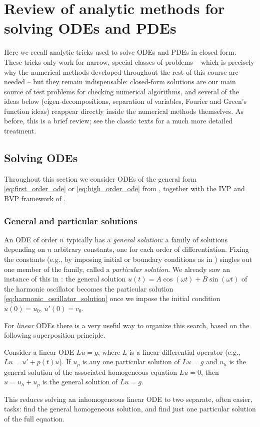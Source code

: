 \chapter{Review of analytic methods for solving ODEs and PDEs}

Here we recall analytic tricks used to solve ODEs and PDEs in closed form.
These tricks only work for narrow, special classes of problems --
which is precisely why the numerical methods developed throughout the
rest of this course are needed -- but they remain indispensable:
closed-form solutions are our main source of test problems for
checking numerical algorithms, and several of the ideas below
(eigen-decompositions, separation of variables, Fourier and Green's
function ideas) reappear directly inside the numerical methods
themselves. As before, this is a brief review; see the classic texts
\cite{boyce2017elementary,strauss2007partial} for a much more detailed
treatment.

\section{Solving ODEs}

Throughout this section we consider ODEs of the general form
\eqref{eq:first_order_ode} or \eqref{eq:high_order_ode} from
, together with the IVP and BVP framework of
.

\subsection{General and particular solutions}

An ODE of order $n$ typically has a \emph{general solution}: a family
of solutions depending on $n$ arbitrary constants, one for each order
of differentiation. Fixing the constants (e.g., by imposing initial or
boundary conditions as in ) singles out one
member of the family, called a \emph{particular solution}. We already
saw an instance of this in : the general
solution $u(t) = A\cos(\omega t) + B \sin(\omega t)$ of the harmonic
oscillator becomes the particular solution
\eqref{eq:harmonic_oscillator_solution} once we impose the initial
condition $u(0) = u_0$, $u'(0) = v_0$.

For \emph{linear} ODEs there is a very useful way to organize this
search, based on the following superposition principle.

\begin{proposition}
    Consider a linear ODE $Lu = g$, where $L$ is a linear differential
    operator (e.g., $Lu = u' + p(t) u$). If $u_p$ is any one particular
    solution of $Lu=g$ and $u_h$ is the general solution of the
    associated homogeneous equation $Lu=0$, then $u = u_h + u_p$ is the
    general solution of $Lu=g$.
\end{proposition}
This reduces solving an inhomogeneous linear ODE to two separate, often
easier, tasks: find the general homogeneous solution, and find just
one particular solution of the full equation.

